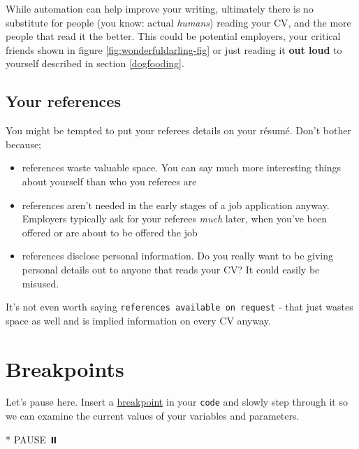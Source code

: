 \documentclass[
]{book}
\newenvironment{Shaded}{\begin{snugshade}}{\end{snugshade}}
\newcommand{\NormalTok}[1]{#1}
\newcommand{\SpecialStringTok}[1]{\textcolor[rgb]{0.31,0.60,0.02}{#1}}
\providecommand{\tightlist}{%
  \setlength{\itemsep}{0pt}\setlength{\parskip}{0pt}}
\begin{document}
While automation can help improve your writing, ultimately there is no substitute for people (you know: actual \emph{humans}) reading your CV, and the more people that read it the better. This could be potential employers, your critical friends shown in figure \ref{fig:wonderfuldarling-fig} or just reading it \textbf{out loud} to yourself described in section \ref{dogfooding}.

\hypertarget{referees}{%
\subsection{Your references}\label{referees}}

You might be tempted to put your referees details on your résumé. Don't bother because;

\begin{itemize}
\tightlist
\item
  references waste valuable space. You can say much more interesting things about yourself than who you referees are
\item
  references aren't needed in the early stages of a job application anyway. Employers typically ask for your referees \emph{much} later, when you've been offered or are about to be offered the job
\item
  references disclose personal information. Do you really want to be giving personal details out to anyone that reads your CV? It could easily be misused.
\end{itemize}

It's not even worth saying \texttt{references\ available\ on\ request} - that just wastes space as well and is implied information on every CV anyway.

\hypertarget{bp7}{%
\section{Breakpoints}\label{bp7}}

Let's pause here. Insert a \href{https://en.wikipedia.org/wiki/Breakpoint}{breakpoint} in your \texttt{code} and slowly step through it so we can examine the current values of your variables and parameters.

\begin{Shaded}
\begin{Highlighting}[]
\SpecialStringTok{* }\NormalTok{PAUSE ⏸️}
\end{Highlighting}
\end{Shaded}
\end{document}
